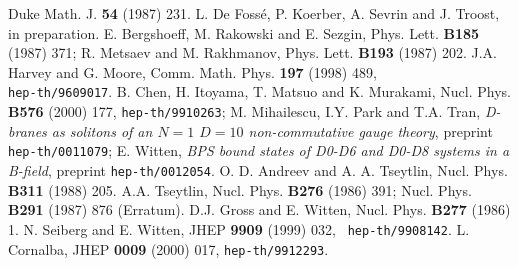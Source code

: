 \documentclass[a4paper,12pt,oneside]{article}
\begin{document}
\begin{thebibliography}{99}
Duke Math. J. {\bf 54} (1987) 231.
 L. De Foss\'e, P. Koerber, A. Sevrin and J. Troost, in 
preparation.
 E. Bergshoeff, M. Rakowski and E. Sezgin, Phys. Lett.
{\bf B185} (1987) 371; R. Metsaev and M. Rakhmanov, Phys. Lett.
{\bf B193} (1987) 202.
 J.A. Harvey and G. Moore, Comm. Math. Phys. {\bf 197} (1998) 
489,\\ {\tt hep-th/9609017}.
 B. Chen, H. Itoyama, T. Matsuo and K. Murakami, 
Nucl. Phys. {\bf B576} (2000) 177, {\tt hep-th/9910263}; 
M. Mihailescu, I.Y. Park and T.A. Tran, {\em D-branes as solitons of an $N=1$
$D=10$ non-commutative gauge theory}, preprint {\tt 
hep-th/0011079}; E. Witten, {\em BPS bound states of D0-D6 and D0-D8 
systems in a B-field}, preprint {\tt hep-th/0012054}.
 O. D. Andreev and A. A. Tseytlin, Nucl. Phys. {\bf B311}
(1988) 205.
 A.A. Tseytlin, Nucl. Phys. {\bf B276} (1986) 391; Nucl. 
Phys. {\bf B291} (1987) 876 (Erratum).
 D.J. Gross and E. Witten, Nucl. Phys. {\bf B277} (1986) 1.
 N. Seiberg and E. Witten, JHEP {\bf 9909} (1999) 032, {\tt 
hep-th/9908142}.
 L. Cornalba, JHEP {\bf 0009} (2000) 017,
{\tt hep-th/9912293}.
\end{thebibliography} 
\end{document}
